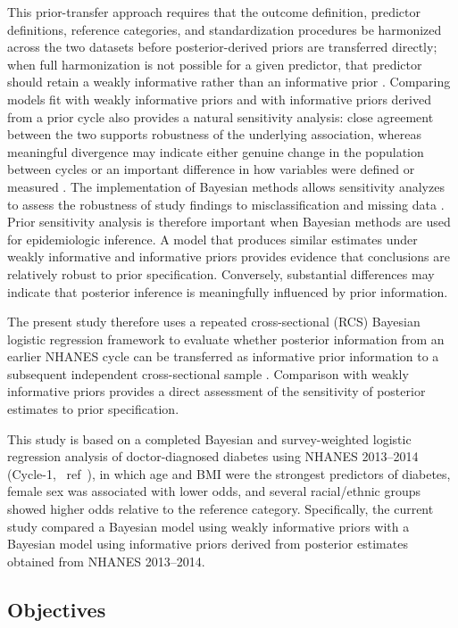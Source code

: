 \documentclass[11pt]{article}
\begin{document}
This prior-transfer approach requires that the outcome definition,
predictor definitions, reference categories, and standardization procedures
be harmonized across the two datasets before posterior-derived priors are
transferred directly; when full harmonization is not possible for a given
predictor, that predictor should retain a weakly informative rather than an
informative prior \citep{Baldwin2017,Hoeting1999}. Comparing models fit with
weakly informative priors and with informative priors derived from a prior
cycle also provides a natural sensitivity analysis: close agreement between
the two supports robustness of the underlying association, whereas
meaningful divergence may indicate either genuine change in the population
between cycles or an important difference in how variables were defined or
measured \citep{Ospel2024,VandeSchoot2021}.
The implementation of Bayesian methods allows sensitivity analyzes to assess the robustness of study findings to misclassification and missing data \cite{Luta2013Bayesian}. Prior sensitivity analysis is therefore important when Bayesian methods are used for epidemiologic inference. A model that produces similar estimates under weakly informative and informative priors provides evidence that conclusions are relatively robust to prior specification. Conversely, substantial differences may indicate that posterior inference is meaningfully influenced by prior information. 

The present study therefore uses a repeated cross-sectional (RCS) Bayesian
logistic regression framework to evaluate whether posterior information
from an earlier NHANES cycle can be transferred as informative prior
information to a subsequent independent cross-sectional sample
\cite{Eisinga2002,Steyn2025}. Comparison with weakly informative priors
provides a direct assessment of the sensitivity of posterior estimates to
prior specification.

This study is based on a completed Bayesian and survey-weighted logistic
regression analysis of doctor-diagnosed diabetes using NHANES 2013--2014 (Cycle-1, ~ref\ ),
in which age and BMI were the strongest predictors of diabetes, female sex
was associated with lower odds, and several racial/ethnic groups showed
higher odds relative to the reference category. Specifically, the current study compared a Bayesian model using weakly informative priors with a Bayesian model using informative priors derived from posterior estimates obtained from NHANES 2013--2014. 

 
\subsection{Objectives}
\end{document}

